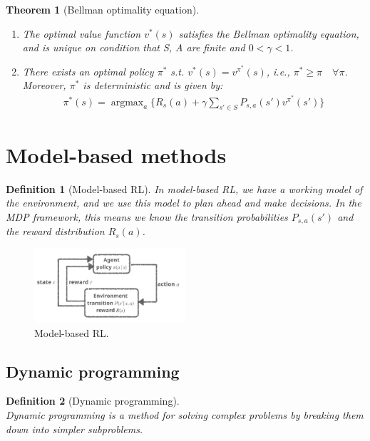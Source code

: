 \documentclass[11pt]{book} %
\DeclareMathOperator*{\argmax}{argmax}
\newtheorem{theorem}{Theorem}[section]
\newtheorem{definition}{Definition}[section]
\begin{document}
\begin{theorem}[Bellman optimality equation]\ \\
    \begin{enumerate}
        \item The optimal value function $v^*(s)$ satisfies the Bellman optimality equation, and is unique on condition that S, A are finite and $0 < \gamma < 1$.
        \item There exists an optimal policy $\pi^*$ s.t. $v^*(s) = v^{\pi^*}(s)$, i.e., $\pi^* \geq \pi \quad \forall \pi $. \\
        Moreover, $\pi^*$ is deterministic and is given by:
        \begin{align*}
            \pi^*(s) = \argmax_{a} \{R_s(a) + \gamma \sum_{s' \in S} P_{s,a}(s') v^{\pi^*}(s') \}
        \end{align*}
    \end{enumerate}
\end{theorem}

\section{Model-based methods}

\begin{definition}[Model-based RL]
    In model-based RL, we have a working model of the environment, and we use this model to plan ahead and make decisions.
    In the MDP framework, this means we know the transition probabilities $P_{s,a}(s')$ and the reward distribution $R_s(a)$.
\end{definition}

\begin{figure}
    \centering
    \includegraphics[width=0.5\textwidth]{./Figs/model_based_RL.jpeg}
    \caption{Model-based RL.}
    \label{fig:model_based}
\end{figure}

\subsection{Dynamic programming}

\begin{definition}[Dynamic programming]\ \\
    Dynamic programming is a method for solving complex problems by breaking them down into simpler subproblems. 
\end{definition}
\end{document}
